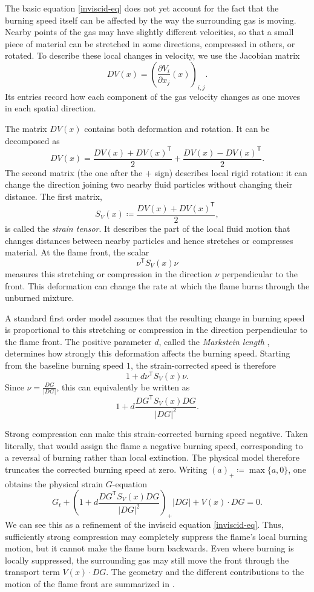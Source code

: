\documentclass[11pt,reqno,noamsfonts]{amsart}
\theoremstyle{definition}
\theoremstyle{remark}
\begin{document}
The basic equation \eqref{inviscid-eq} does not yet account for the fact that the burning
speed itself can be affected by the way the surrounding gas is moving.
Nearby points of the gas may have slightly different velocities, so that
a small piece of material can be stretched in some directions, compressed
in others, or rotated. To describe these local changes in velocity, we
use the Jacobian matrix
\[
  DV(x)=
  \left(
    \frac{\partial V_i}{\partial x_j}(x)
  \right)_{i,j}.
\]
Its entries record how each component of the gas velocity changes as one
moves in each spatial direction.

The matrix $DV(x)$ contains both deformation and rotation. It can be
decomposed as
\[
  DV(x)
  =
  \frac{DV(x)+DV(x)^{\mathsf T}}2
  +
  \frac{DV(x)-DV(x)^{\mathsf T}}2.
\]
The second matrix (the one after the $+$ sign) describes local rigid rotation: it can change the
direction joining two nearby fluid particles without changing their
distance. The first matrix,
\[
  S_V(x)
  \coloneqq 
  \frac{DV(x)+DV(x)^{\mathsf T}}2,
\]
is called the {\em strain tensor}. It describes the part of the local fluid
motion that changes distances between nearby particles and hence
stretches or compresses material.
At the flame front, the scalar
\[
  \nu^{\mathsf T}S_V(x)\nu
\]
measures this stretching or compression in the direction $\nu$
perpendicular to the front. This deformation can change the rate at
which the flame burns through the unburned mixture.

A standard first order model assumes that the resulting change in
burning speed is proportional to this stretching or compression in the
direction perpendicular to the flame front. The positive parameter $d$, called the {\em Markstein length} \cite{Markstein1964}, determines how
strongly this deformation affects the burning speed. Starting from the baseline burning speed $1$, the
strain-corrected speed is therefore
\[
  1+d \nu^{\mathsf T}S_V(x)\nu.
\]
Since
  $\nu=\frac{DG}{|DG|}$,
this can equivalently be written as
\[
  1+d\frac{DG^{\mathsf T}S_V(x)DG}{|DG|^2}.
\]

Strong compression can make this strain-corrected burning speed
negative. Taken literally, that would assign the flame a negative
burning speed, corresponding to a reversal of burning rather than local
extinction.
The physical model therefore truncates the corrected burning speed at
zero. Writing
  $(a)_+\coloneqq \max\{a,0\}$,
one obtains the physical strain $G$-equation
\begin{equation}\label{eq:physical-intro}
  G_t+
  \left(
    1+d\frac{DG^{\mathsf T}S_V(x)DG}{|DG|^2}
  \right)_+|DG|
  +V(x)\cdot DG=0.
\end{equation}
We can see this as a refinement of the inviscid equation \eqref{inviscid-eq}. Thus, sufficiently strong compression may completely suppress the
flame's  local burning motion, but it cannot make the flame burn
backwards. Even where burning is locally suppressed, the surrounding
gas may still move the front through the transport term $V(x)\cdot DG$. The geometry and the different contributions to the motion of the
flame front are summarized in .
\end{document}
